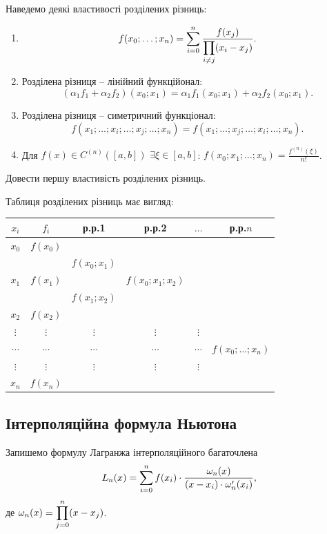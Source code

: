 Наведемо деякі властивості розділених різниць:
\begin{enumerate}
    \item \[f(x_0; \ldots; x_n) = \displaystyle\sum\limits_{i=0}^n \dfrac{f(x_j)}{\displaystyle\prod\limits_{i\ne j}(x_i-x_j)}.\]
    \item Розділена різниця -- лінійний функційонал: \[ (\alpha_1 f_1 + \alpha_2 f_2)(x_0; x_1) = \alpha_1 f_1(x_0;x_1) + \alpha_2 f_2(x_0;x_1). \]
    \item Розділена різниця -- симетричний функціонал: \[ f(x_1; \ldots; x_i; \ldots; x_j; \ldots; x_n) = f(x_1; \ldots; x_j; \ldots; x_i; \ldots; x_n). \]
    \item Для $f(x) \in C^{(n)}([a,b])$ $\exists \xi \in [a,b]$: $f(x_0; x_1; \ldots; x_n) = \frac{f^{(n)}(\xi)}{n!}$.
\end{enumerate}
\begin{problem}
    Довести першу властивість розділених різниць.
\end{problem}
Таблиця розділених різниць має вигляд:
\begin{table}[H]
    \centering
    \begin{tabular}{c|ccccc}
        $x_i$ & $f_i$ & р.р.1 & р.р.2 & $\ldots$ & р.р.$n$ \\ \hline
        $x_0$ & $f(x_0)$ & & & & \\
        & & $f(x_0;x_1)$ & & & \\
        $x_1$ & $f(x_1)$ & & $f(x_0;x_1;x_2)$ & & \\
        & & $f(x_1;x_2)$ & & & \\
        $x_2$ & $f(x_2)$ & & & & \\
        $\vdots$ & $\vdots$ & $\vdots$ & $\vdots$ & $\vdots$ & \\
        $\cdots$ & $\cdots$ & $\cdots$ & $\cdots$ & $\cdots$ & $f(x_0;\ldots;x_n)$ \\
        $\vdots$ & $\vdots$ & $\vdots$ & $\vdots$ & $\vdots$ & \\
        $x_n$ & $f(x_n)$ & & & & \\
    \end{tabular}
\end{table}
\subsection{Інтерполяційна формула Ньютона}
Запишемо формулу Лагранжа інтерполяційного багаточлена
\begin{equation}
    \label{eq:6.15}
    L_n(x) = \displaystyle\sum\limits_{i=0}^n f(x_i) \cdot \dfrac{\omega_n(x)}{(x-x_i)\cdot \omega_n'(x_i)},
\end{equation}
де $\omega_n(x) = \displaystyle\prod\limits_{j=0}^n (x-x_j)$. \\

